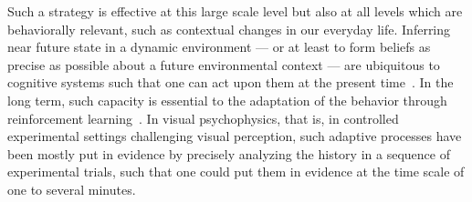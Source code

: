 \documentclass[profile,final,english, draft]{article}%
\newcommand{\citep}[1]{\parencite{#1}}
\begin{document}
Such a strategy is effective at this large scale level
but also at all levels which are behaviorally relevant,
such as contextual changes in our everyday life.
Inferring near future state in a dynamic environment ---
or at least to form beliefs as precise as possible
about a future environmental context ---
are ubiquitous to cognitive systems
such that one can act upon them at the present time~\citep{ref}.
In the long term, such capacity is essential to the adaptation
of the behavior through reinforcement learning~\citep{ref}.
In visual psychophysics, that is,
in controlled experimental settings challenging visual perception,
such adaptive processes have been mostly put in evidence
by precisely analyzing the history in a sequence of experimental trials,
such that one could put them in evidence
at the time scale of one to several minutes.
\end{document}
